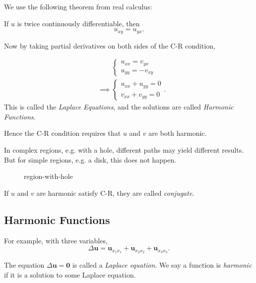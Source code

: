 We use the following theorem from real calculus:
\begin{theorem}
	If $u$ is twice continuously differentiable, then \[
		u_{xy} = u_{yx}
	.\] 
\end{theorem}

Now by taking partial derivatives on both sides of the C-R condition,

\begin{align*}
	&\phantom{\implies}\begin{cases}
		u_{x x} = v_{y x} \\
		u_{y y} = -v_{x y}
	\end{cases}\\
	&\implies \begin{cases}
		u_{x x} + u_{y y} = 0\\
		v_{x x} + v_{y y} = 0
	\end{cases}
.\end{align*}
This is called the \textit{Laplace Equations}, and the solutions are called \textit{Harmonic Functions}.

Hence the C-R condition requires that $u$ and $v$ are both harmonic.

In complex regions, e.g. with a hole, different paths may yield different results. But for simple regions, e.g. a disk, this does not happen.

\begin{figure}[ht]
    \centering
    \caption{region-with-hole}
    \label{fig:region-with-hole}
\end{figure}

\begin{definition}
	If $u$ and $v$ are harmonic satisfy C-R, they are called \textit{conjugate}.
\end{definition}


\subsection{Harmonic Functions}


\begin{definition}[Laplacian]
	For example, with three variables, 
	\[
		\Delta \mathbf{u} = \mathbf{u}_{x_1x_1}+\mathbf{u}_{x_2x_2}+\mathbf{u}_{x_3x_3}
	.\] 

	The equation $\Delta \mathbf{u} = \mathbf{0}$ is called a \textit{Laplace equation}. We say a function is \textit{harmonic} if it is a solution to some Laplace equation.
\end{definition}


